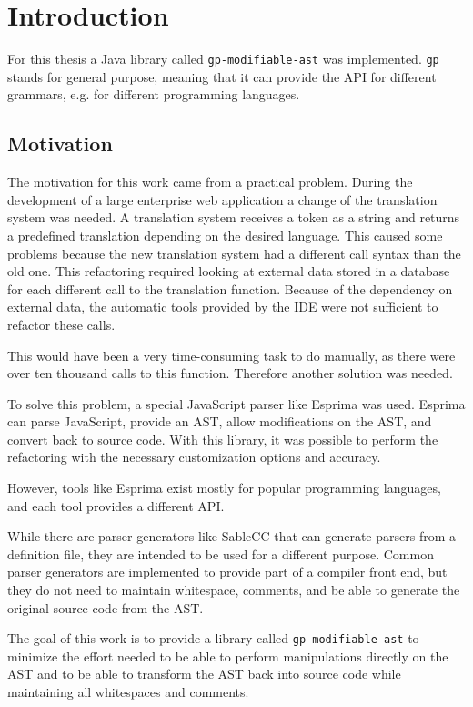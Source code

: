 \section{Introduction}

For this thesis a Java library called \verb|gp-modifiable-ast| was implemented. 
\verb|gp| stands for general purpose, meaning that it can provide the API for different grammars, e.g. for different programming languages.

\subsection{Motivation}

The motivation for this work came from a practical problem. 
During the development of a large enterprise web application a change of the translation system was needed.
A translation system receives a token as a string and returns a predefined translation depending on the desired language.
This caused some problems because the new translation system had a different call syntax than the old one.
This refactoring required looking at external data stored in a database for each different call to the translation function.
Because of the dependency on external data, the automatic tools provided by the IDE were not sufficient to refactor these calls.

This would have been a very time-consuming task to do manually, as there were over ten thousand calls to this function. Therefore another solution was needed.

To solve this problem, a special JavaScript parser like Esprima \cite{esprima} was used. 
Esprima can parse JavaScript, provide an AST, allow modifications on the AST, and convert back to source code.
With this library, it was possible to perform the refactoring with the necessary customization options and accuracy.

However, tools like Esprima exist mostly for popular programming languages, and each tool provides a different API.

While there are parser generators like SableCC \cite{sablecc} that can generate parsers from a definition file, they are intended to be used for a different
purpose.
Common parser generators are implemented to provide part of a compiler front end, but they do not need to maintain whitespace,
comments, and be able to generate the original source code from the AST.

The goal of this work is to provide a library called \verb|gp-modifiable-ast| to minimize the effort needed to be able to perform 
manipulations directly on the AST and
to be able to transform the AST back into source code while maintaining all whitespaces and comments.

